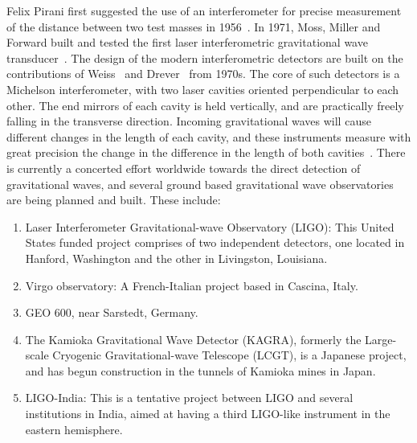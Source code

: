 Felix Pirani first suggested the use of an interferometer for precise
measurement of the distance between two test masses in 1956~\cite{Pirani:1956}.
In 1971, Moss, Miller and Forward built and tested the first laser
interferometric gravitational wave transducer~\cite{Forward:1971}. The design
of the modern interferometric detectors are built on the contributions 
of Weiss~\cite{Weiss:1972} and Drever~\cite{Drever:1980} from 1970s. The
core of such detectors is a Michelson interferometer, with two laser 
cavities oriented perpendicular to each other. The end mirrors of each 
cavity is held vertically, and are practically freely falling in the 
transverse direction. Incoming gravitational waves will cause different 
changes in the length of each cavity, and these instruments measure with 
great precision the change in the difference in the length of both 
cavities~\cite{Saulson:1995zi}. 
%
There is currently a concerted effort worldwide towards the direct detection 
of gravitational waves, and several ground based gravitational wave observatories 
are being planned and built. These include:
%
\begin{enumerate}
 \item Laser Interferometer Gravitational-wave Observatory (LIGO): This
 United States funded project comprises of two independent detectors, one 
 located in Hanford, Washington and the other in Livingston, Louisiana. 
 \item Virgo observatory: A French-Italian project based in Cascina, Italy.
 \item GEO 600, near Sarstedt, Germany.
 \item The Kamioka Gravitational Wave Detector (KAGRA), formerly the Large-scale
 Cryogenic Gravitational-wave Telescope (LCGT), is a Japanese project, and has
 begun construction in the tunnels of Kamioka mines in Japan.  
 \item LIGO-India: This is a tentative project between LIGO and several 
 institutions in India, aimed at having a third LIGO-like instrument in the 
 eastern hemisphere.
\end{enumerate}
% 
